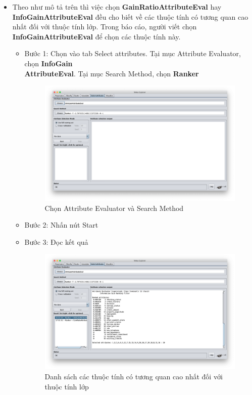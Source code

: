 \documentclass[a4paper, 12pt]{article}
\begin{document}
\begin{itemize}
    \item Theo như mô tả trên thì việc chọn \textbf{GainRatioAttributeEval} hay \textbf{InfoGainAttributeEval} đều cho biết về các thuộc tính có tương quan cao nhất đối với thuộc tính lớp. Trong báo cáo, người viết chọn \textbf{InfoGainAttributeEval} để chọn các thuộc tính này.
    \begin{itemize}
        \item Bước 1: Chọn vào tab Select attributes. Tại mục Attribute Evaluator, chọn \textbf{InfoGain\\AttributeEval}. Tại mục Search Method, chọn \textbf{Ranker}
        \begin{figure}[H]
            \begin{center}
                \includegraphics[scale = 0.35]{images/selectAttributeCreditG.png}
                \caption{Chọn Attribute Evaluator và Search Method}
            \end{center}
        \end{figure}
        \item Bước 2: Nhấn nút Start
        \item Bước 3: Đọc kết quả
        \begin{figure}[H]
            \begin{center}
                \includegraphics[scale = 0.35]{images/creditG_result.png}
                \caption{Danh sách các thuộc tính có tương quan cao nhất đối với thuộc tính lớp}
            \end{center}
        \end{figure}
    \end{itemize}


\end{itemize}
\end{document}
